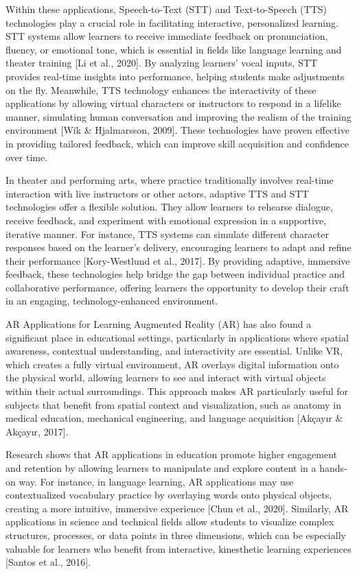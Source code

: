 Within these applications, Speech-to-Text (STT) and Text-to-Speech (TTS) technologies play a crucial role in facilitating interactive, personalized learning. STT systems allow learners to receive immediate feedback on pronunciation, fluency, or emotional tone, which is essential in fields like language learning and theater training [Li et al., 2020]. By analyzing learners' vocal inputs, STT provides real-time insights into performance, helping students make adjustments on the fly. Meanwhile, TTS technology enhances the interactivity of these applications by allowing virtual characters or instructors to respond in a lifelike manner, simulating human conversation and improving the realism of the training environment [Wik & Hjalmarsson, 2009]. These technologies have proven effective in providing tailored feedback, which can improve skill acquisition and confidence over time.

In theater and performing arts, where practice traditionally involves real-time interaction with live instructors or other actors, adaptive TTS and STT technologies offer a flexible solution. They allow learners to rehearse dialogue, receive feedback, and experiment with emotional expression in a supportive, iterative manner. For instance, TTS systems can simulate different character responses based on the learner's delivery, encouraging learners to adapt and refine their performance [Kory-Westlund et al., 2017]. By providing adaptive, immersive feedback, these technologies help bridge the gap between individual practice and collaborative performance, offering learners the opportunity to develop their craft in an engaging, technology-enhanced environment.

AR Applications for Learning
Augmented Reality (AR) has also found a significant place in educational settings, particularly in applications where spatial awareness, contextual understanding, and interactivity are essential. Unlike VR, which creates a fully virtual environment, AR overlays digital information onto the physical world, allowing learners to see and interact with virtual objects within their actual surroundings. This approach makes AR particularly useful for subjects that benefit from spatial context and visualization, such as anatomy in medical education, mechanical engineering, and language acquisition [Akçayır & Akçayır, 2017].

Research shows that AR applications in education promote higher engagement and retention by allowing learners to manipulate and explore content in a hands-on way. For instance, in language learning, AR applications may use contextualized vocabulary practice by overlaying words onto physical objects, creating a more intuitive, immersive experience [Chun et al., 2020]. Similarly, AR applications in science and technical fields allow students to visualize complex structures, processes, or data points in three dimensions, which can be especially valuable for learners who benefit from interactive, kinesthetic learning experiences [Santos et al., 2016].

